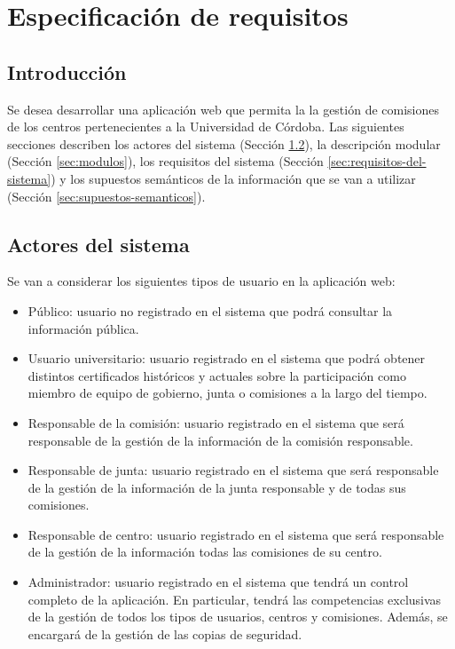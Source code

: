 \chapter{Especificación de requisitos}\label{cap:especificacion_requisitos}

\section{Introducción}

Se desea desarrollar una aplicación web que permita la la gestión de comisiones de los centros pertenecientes a la Universidad de Córdoba. Las siguientes secciones describen los actores del sistema (Sección \ref{sec:actores}), la descripción modular (Sección \ref{sec:modulos}), los requisitos del sistema (Sección  \ref{sec:requisitos-del-sistema})  y los supuestos semánticos de la información que se van a utilizar (Sección \ref{sec:supuestos-semanticos}).

\section{Actores del sistema}\label{sec:actores}

Se van a considerar los siguientes tipos de usuario en la aplicación web: 
    \begin{itemize}
    \item Público: usuario no registrado en el sistema que podrá consultar la información pública.
    \item Usuario universitario: usuario registrado en el sistema que podrá obtener distintos certificados históricos y actuales sobre la participación como miembro de equipo de gobierno, junta o comisiones a la largo del tiempo.
    \item Responsable de la comisión: usuario registrado en el sistema que será responsable de la gestión de la información de la comisión responsable.
    \item Responsable de junta: usuario registrado en el sistema que será responsable de la gestión de la información de la junta responsable y de todas sus comisiones.
    \item Responsable de centro: usuario registrado en el sistema que será responsable de la gestión de la información todas las comisiones de su centro.
    \item Administrador: usuario registrado en el sistema que tendrá un control completo de la aplicación. En particular, tendrá las competencias exclusivas de la gestión de todos los tipos de usuarios, centros y comisiones. Además, se encargará de la gestión de las copias de seguridad.    
    \end{itemize}

